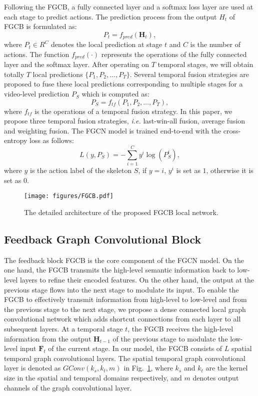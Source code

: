 \documentclass[runningheads]{llncs}
\begin{document}
Following the FGCB, a fully connected layer and a softmax loss layer are used at each stage to predict actions. The prediction process from the output $H_t$ of FGCB is formulated as:
\begin{equation}
P_t = f_{pred}(\textbf{H}_t),
\end{equation}
where $P_t\in R^C$ denotes the local prediction at stage $t$ and $C$ is the number of actions. The function $f_{pred}(\cdot)$ represents the operations of the fully connected layer and the softmax layer. After operating on $T$ temporal stages, we will obtain totally $T$ local predictions $\{P_1,P_2,\dots,P_T\}$. Several temporal fusion strategies are proposed to fuse these local predictions corresponding to multiple stages for a video-level prediction $P_S$ which is computed as:
\begin{equation}
P_S = f_{tf}(P_1,P_2,\dots,P_T),
\end{equation}
where $f_{tf}$ is the operations of a temporal fusion strategy. In this paper, we propose three temporal fusion strategies, \textit{i.e.} last-win-all fusion, average fusion and weighting fusion. The FGCN model is trained end-to-end with the cross-entropy loss as follows:
\begin{equation}
L(y,P_S) = -\sum_{i=1}^{C}y^i \log(P_S^i),
\end{equation}
where $y$ is the action label of the skeleton $S$, if $y=i$, $y^i$ is set as $1$, otherwise it is set as $0$.

\begin{figure}[t]
	\centering
	\texttt{[image: figures/FGCB.pdf]}
	\caption{The detailed architecture of the proposed FGCB local network.}
	\vspace{-4mm}
	\label{fig-fgcb}
\end{figure}

\subsection{Feedback Graph Convolutional Block}
\label{section fgcb}

The feedback block FGCB is the core component of the FGCN model. On the one hand, the FGCB transmits the high-level semantic information back to low-level layers to refine their encoded features. On the other hand, the output at the previous stage flows into the next stage to modulate its input. To enable the FGCB to effectively transmit information from high-level to low-level and from the previous stage to the next stage, we propose a dense connected local graph convolutional network which adds shortcut connections from each layer to all subsequent layers. At a temporal stage $t$, the FGCB receives the high-level information from the output $\textbf{H}_{t-1}$ of the previous stage to modulate the low-level input $\textbf{F}_t$ of the current stage. In our model, the FGCB consists of $L$ spatial temporal graph convolutional layers. The spatial temporal graph convolutional layer is denoted as $GConv(k_s,k_t,m)$ in Fig.~\ref{fig-fgcb}, where $k_s$ and $k_t$ are the kernel size in the spatial and temporal domains respectively, and $m$ denotes output channels of the graph convolutional layer.
\end{document}
